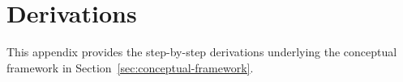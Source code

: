 \documentclass[12pt]{article}
\begin{document}



\section{Derivations} \normalsize
\label{app:derivations}

This appendix provides the step-by-step derivations underlying the conceptual framework in Section~\ref{sec:conceptual-framework}.
\end{document}
